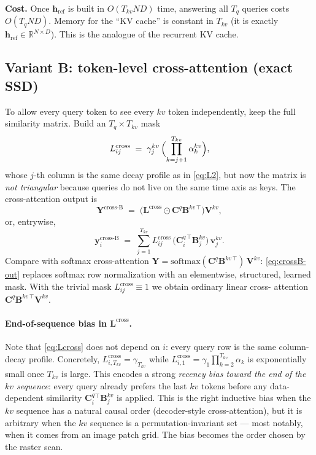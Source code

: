 \documentclass[11pt,a4paper]{article}
\begin{document}
\textbf{Cost.} Once $\bm{h}_{\text{ref}}$ is built in $O(T_{kv}ND)$
time, answering all $T_q$ queries costs $O(T_q ND)$. Memory for the
``KV cache'' is constant in $T_{kv}$ (it is exactly
$\bm{h}_{\text{ref}}\in\mathbb{R}^{N\times D}$). This is the
analogue of the recurrent KV cache.

\subsection{Variant B: token-level cross-attention (exact SSD)}
\label{sec:crossB}

To allow every query token to see every $kv$ token independently,
keep the full similarity matrix. Build an $T_q\times T_{kv}$ mask
\begin{equation}\label{eq:Lcross}
  L^{\text{cross}}_{ij} \;=\; \gamma_j^{kv}\,
        \Bigl(\prod_{k=j+1}^{T_{kv}}\alpha_k^{kv}\Bigr),
\end{equation}
whose $j$-th column is the same decay profile as in \eqref{eq:L2}, but
now the matrix is \emph{not triangular} because queries do not live on
the same time axis as keys. The cross-attention output is
\begin{equation}\label{eq:crossB-out}
  \boxed{\;\bm{Y}^{\text{cross-B}} \;=\; \bigl(\bm{L}^{\text{cross}}\odot\bm{C}^{q}\bm{B}^{kv\,\top}\bigr)\bm{V}^{kv},\;}
\end{equation}
or, entrywise,
\begin{equation}\label{eq:crossB-entry}
  \bm{y}_i^{\text{cross-B}} \;=\; \sum_{j=1}^{T_{kv}} L^{\text{cross}}_{ij}\,
           \bigl(\bm{C}_i^{q\,\top}\bm{B}_j^{kv}\bigr)\,\bm{v}_j^{kv}.
\end{equation}
Compare with softmax cross-attention
$\bm{Y} = \mathrm{softmax}(\bm{C}^q\bm{B}^{kv\,\top})\,\bm{V}^{kv}$:
\eqref{eq:crossB-out} replaces softmax row normalization with an
elementwise, structured, learned mask. With the trivial mask
$L^{\text{cross}}_{ij}\equiv 1$ we obtain ordinary linear cross-
attention $\bm{C}^q\bm{B}^{kv\,\top}\bm{V}^{kv}$.

\paragraph{End-of-sequence bias in $\bm{L}^{\text{cross}}$.} Note that
\eqref{eq:Lcross} does not depend on $i$: every query row is the same
column-decay profile. Concretely, $L^{\text{cross}}_{i,T_{kv}}=\gamma_{T_{kv}}$
while $L^{\text{cross}}_{i,1}=\gamma_1\prod_{k=2}^{T_{kv}}\alpha_k$ is
exponentially small once $T_{kv}$ is large. This encodes a strong
\emph{recency bias toward the end of the $kv$ sequence}: every query
already prefers the last $kv$ tokens before any data-dependent
similarity $\bm{C}^q_i{}^\top\bm{B}^{kv}_j$ is applied. This is the
right inductive bias when the $kv$ sequence has a natural causal order
(decoder-style cross-attention), but it is arbitrary when the $kv$
sequence is a permutation-invariant set — most notably, when it comes
from an image patch grid. The bias becomes the order chosen by the
raster scan.
\end{document}
